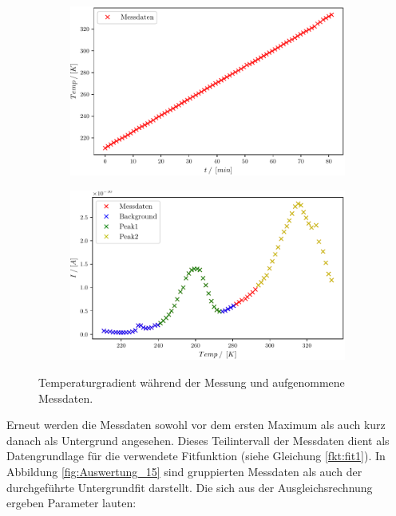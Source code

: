\begin{figure}
\centering
\begin{subfigure}{.5\textwidth}
	\centering
	\includegraphics[width=1\textwidth]{build/2_Temp_Time.pdf}
	\caption{}
	\label{fig:Auswertung_13}
\end{subfigure}%
\begin{subfigure}{.5\textwidth}
	\centering
	\includegraphics[width=1\textwidth]{build/2_Temp_current.pdf}
	\caption{}
	\label{fig:Auswertung_14}
\end{subfigure}
\caption{Temperaturgradient während der Messung und aufgenommene Messdaten.}
\label{fig:Auswertung_13_14}
\end{figure}

Erneut werden die Messdaten sowohl vor dem ersten Maximum als auch kurz danach als Untergrund angesehen. Dieses Teilintervall der Messdaten dient als Datengrundlage für die verwendete Fitfunktion (siehe Gleichung \ref{fkt:fit1}). In Abbildung \ref{fig:Auswertung_15} sind gruppierten Messdaten als auch der durchgeführte Untergrundfit darstellt. Die sich aus der Ausgleichsrechnung ergeben Parameter lauten:

